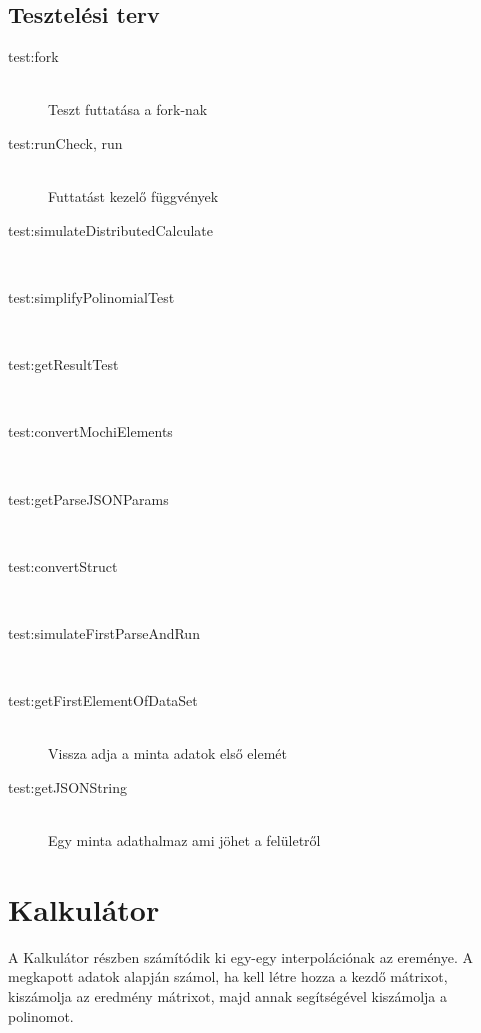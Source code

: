 \subsection{Tesztelési terv}
	\begin{description}
		\item[test:fork] \hfill \\
		Teszt futtatása a fork-nak

		\item[test:runCheck, run] \hfill \\
			Futtatást kezelő függvények 

		\item[test:simulateDistributedCalculate] \hfill \\

		\item[test:simplifyPolinomialTest] \hfill \\

		\item[test:getResultTest] \hfill \\

		\item[test:convertMochiElements] \hfill \\

		\item[test:getParseJSONParams] \hfill \\

		\item[test:convertStruct] \hfill \\
		\item[test:simulateFirstParseAndRun] \hfill \\
		\item[test:getFirstElementOfDataSet] \hfill \\
		Vissza adja a minta adatok első elemét
		\item[test:getJSONString] \hfill \\
		Egy minta adathalmaz ami jöhet a felületről
\end{description}	

\section{Kalkulátor}
A Kalkulátor részben számítódik ki egy-egy interpolációnak az ereménye.
A megkapott adatok alapján számol, ha kell létre hozza a kezdő mátrixot, kiszámolja az eredmény mátrixot, majd annak segítségével kiszámolja a polinomot. \newline

